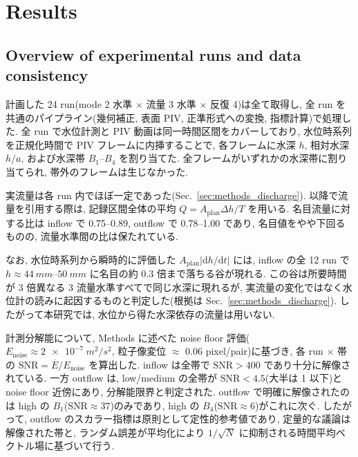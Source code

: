 
\section{Results}
\label{sec:results}

\subsection{Overview of experimental runs and data consistency}
\label{sec:results_overview}

計画した 24 run(mode 2 水準 $\times$ 流量 3 水準 $\times$ 反復 4)は全て取得し, 全 run を共通のパイプライン(幾何補正, 表面 PIV, 正準形式への変換, 指標計算)で処理した. 全 run で水位計測と PIV 動画は同一時間区間をカバーしており, 水位時系列を正規化時間で PIV フレームに内挿することで, 各フレームに水深 $h$, 相対水深 $h/a$, および水深帯 $B_1$--$B_4$ を割り当てた. 全フレームがいずれかの水深帯に割り当てられ, 帯外のフレームは生じなかった.

実流量は各 run 内でほぼ一定であった(Sec.~\ref{sec:methods_discharge}). 以降で流量を引用する際は, 記録区間全体の平均 $Q = A_{\mathrm{plan}} \Delta h / T$ を用いる. 名目流量に対する比は inflow で 0.75--0.89, outflow で 0.78--1.00 であり, 名目値をやや下回るものの, 流量水準間の比は保たれている.

なお, 水位時系列から瞬時的に評価した $A_{\mathrm{plan}} \left| \mathrm{d}h/\mathrm{d}t \right|$ には, inflow の全 12 run で $h \approx \SIrange{44}{50}{mm}$ に名目の約 0.3 倍まで落ちる谷が現れる. この谷は所要時間が 3 倍異なる 3 流量水準すべてで同じ水深に現れるが, 実流量の変化ではなく水位計の読みに起因するものと判定した(根拠は Sec.~\ref{sec:methods_discharge}). したがって本研究では, 水位から得た水深依存の流量は用いない.

計測分解能について, Methods に述べた noise floor 評価($E_{\mathrm{noise}} \approx \SI{2e-7}{m^2/s^2}$, 粒子像変位 $\approx$ 0.06 pixel/pair)に基づき, 各 run $\times$ 帯の $\mathrm{SNR} = \overline{E}/E_{\mathrm{noise}}$ を算出した. inflow は全帯で $\mathrm{SNR} > 400$ であり十分に解像されている. 一方 outflow は, low/medium の全帯が $\mathrm{SNR} < 4.5$(大半は 1 以下)と noise floor 近傍にあり, 分解能限界と判定された. outflow で明確に解像されたのは high の $B_1$($\mathrm{SNR} \approx 37$)のみであり, high の $B_4$($\mathrm{SNR} \approx 6$)がこれに次ぐ. したがって, outflow のスカラー指標は原則として定性的参考値であり, 定量的な議論は解像された帯と, ランダム誤差が平均化により $1/\sqrt{N}$ に抑制される時間平均ベクトル場に基づいて行う.

